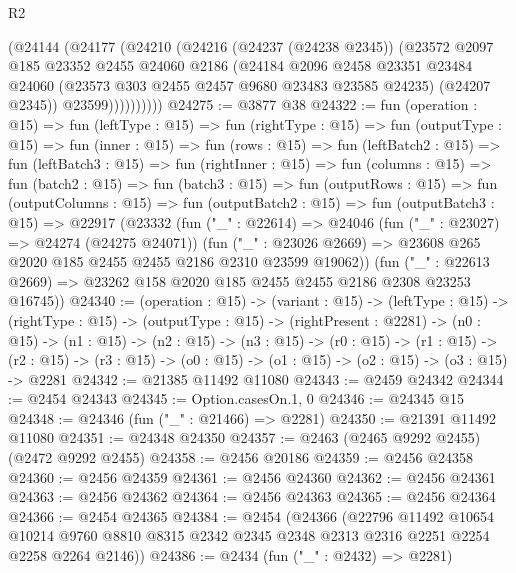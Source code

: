 \begin{lexlean}{R2}
\begin{coremodule}
              (@24144
                (@24177
                  (@24210
                    (@24216
                      (@24237 (@24238 @2345))
                      (@23572
                        @2097
                        @185
                        @23352
                        @2455
                        @24060
                        @2186
                        (@24184
                          @2096
                          @2458
                          @23351
                          @23484
                          @24060
                          (@23573 @303 @2455 @2457 @9680 @23483 @23585 @24235)
                          (@24207 @2345))
                        @23599))))))))))
@24275 := @3877 @38
@24322 := fun (operation : @15) =>
  fun (leftType : @15) =>
  fun (rightType : @15) =>
  fun (outputType : @15) =>
  fun (inner : @15) =>
  fun (rows : @15) =>
  fun (leftBatch2 : @15) =>
  fun (leftBatch3 : @15) =>
  fun (rightInner : @15) =>
  fun (columns : @15) =>
  fun (batch2 : @15) =>
  fun (batch3 : @15) =>
  fun (outputRows : @15) =>
  fun (outputColumns : @15) =>
  fun (outputBatch2 : @15) =>
  fun (outputBatch3 : @15) =>
  @22917
    (@23332
      (fun ("_" : @22614) =>
      @24046
        (fun ("_" : @23027) => @24274 (@24275 @24071))
        (fun ("_" : @23026 @2669) => @23608 @265 @2020 @185 @2455 @2455 @2186 @2310 @23599 @19062))
      (fun ("_" : @22613 @2669) => @23262 @158 @2020 @185 @2455 @2455 @2186 @2308 @23253 @16745))
@24340 := (operation : @15) ->
  (variant : @15) ->
  (leftType : @15) ->
  (rightType : @15) ->
  (outputType : @15) ->
  (rightPresent : @2281) ->
  (n0 : @15) ->
  (n1 : @15) ->
  (n2 : @15) ->
  (n3 : @15) ->
  (r0 : @15) ->
  (r1 : @15) ->
  (r2 : @15) -> (r3 : @15) -> (o0 : @15) -> (o1 : @15) -> (o2 : @15) -> (o3 : @15) -> @2281
@24342 := @21385 @11492 @11080
@24343 := @2459 @24342
@24344 := @2454 @24343
@24345 := Option.casesOn.{1, 0}
@24346 := @24345 @15
@24348 := @24346 (fun ("_" : @21466) => @2281)
@24350 := @21391 @11492 @11080
@24351 := @24348 @24350
@24357 := @2463 (@2465 @9292 @2455) (@2472 @9292 @2455)
@24358 := @2456 @20186
@24359 := @2456 @24358
@24360 := @2456 @24359
@24361 := @2456 @24360
@24362 := @2456 @24361
@24363 := @2456 @24362
@24364 := @2456 @24363
@24365 := @2456 @24364
@24366 := @2454 @24365
@24384 := @2454
    (@24366
      (@22796
        @11492
        @10654
        @10214
        @9760
        @8810
        @8315
        @2342
        @2345
        @2348
        @2313
        @2316
        @2251
        @2254
        @2258
        @2264
        @2146))
@24386 := @2434 (fun ("_" : @2432) => @2281)

\end{coremodule}
\end{lexlean}
